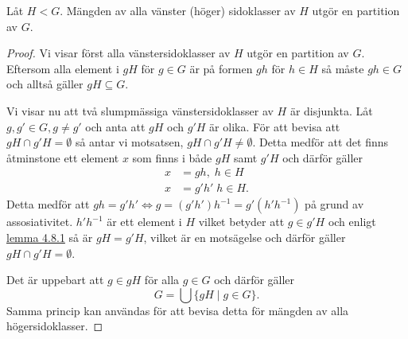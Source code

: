 \documentclass{article}
\theoremstyle{definition}
\begin{document}
\hypertarget{lemma4.2}{}
\begin{mylemma}{}{}
  Låt $H < G$.
  Mängden av alla vänster (höger) sidoklasser av $H$ utgör en partition av $G$.
\end{mylemma}
\begin{proof}
  Vi visar först alla vänstersidoklasser av $H$ utgör en partition av $G$. 
  Eftersom alla element i $gH$ för $g \in G$ är på formen $gh$ för $h \in H$ så måste $gh \in G$
  och alltså gäller $gH \subseteq G$.

  Vi visar nu att två slumpmässiga vänstersidoklasser av $H$ är disjunkta.
  Låt
  $g, g' \in G, g \neq g'$ och anta att $gH$ och $g'H$ är olika. För att bevisa att 
  $gH \cap g'H = \emptyset$ så antar vi motsatsen, $gH \cap g'H \neq \emptyset$.
  Detta medför att det finns åtminstone ett element $x$ som finns i både $gH$ samt $g'H$ 
  och därför gäller
  \begin{align*}
    x &= gh, \; h \in H \\
    x &= g'h' \; h \in H.
  \end{align*}
  Detta medför att $gh = g'h' \iff g = (g'h')h^{-1} = g'(h'h^{-1})$ på grund av assosiativitet.
  $h'h^{-1}$ är ett element i $H$ vilket betyder att $g \in g'H$ och enligt 
  \hyperlink{lemma4.1}{lemma 4.8.1} så är $gH = g'H$, vilket är en motsägelse och därför 
  gäller $gH \cap g'H = \emptyset$.

  Det är uppebart att $g \in gH$ för alla $g \in G$ och därför gäller 
  \[G = \bigcup \{gH \; |\; g \in G\}.\]
  Samma princip kan användas för att bevisa detta för mängden av alla
  \linebreak högersidoklasser.
\end{proof}
\end{document}
